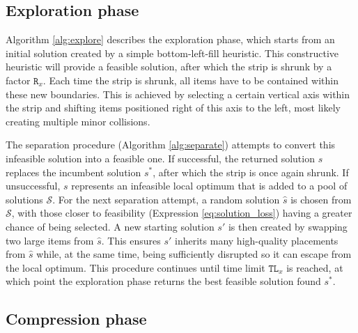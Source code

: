 \documentclass[preprint, 11pt, authoryear]{elsarticle}
\newcommand{\JEROENI}[1]{\todo[inline, color=orange!30, size=\scriptsize]{\textbf{J}: #1}}
\newcommand{\LUKEI}[1]{\todo[inline, color=red!30, size=\scriptsize]{\textbf{L}: #1}}
\begin{document}
 

\subsection{Exploration phase} \label{section:exploration_phase}



Algorithm \ref{alg:explore} describes the exploration phase, which starts from an initial solution created by a simple bottom-left-fill heuristic.
This constructive heuristic will provide a feasible solution, after which the strip is shrunk by a factor $\texttt{R}_{x}$.
Each time the strip is shrunk, all items have to be contained within these new boundaries.
This is achieved by selecting a certain vertical axis within the strip and shifting items positioned right of this axis to the left, most likely creating multiple minor collisions.

The separation procedure (Algorithm \ref{alg:separate}) attempts to convert this infeasible solution into a feasible one.
If successful, the returned solution $s$ replaces the incumbent solution $s^*$, after which the strip is once again shrunk.
If unsuccessful, $s$ represents an infeasible local optimum that is added to a pool of solutions $\mathcal{S}$.
For the next separation attempt, a random solution $\hat{s}$ is chosen from $\mathcal{S}$, with those closer to feasibility (Expression \ref{eq:solution_loss}) having a greater chance of being selected.
A new starting solution $s'$ is then created by swapping two large items from $\hat{s}$.
This ensures $s'$ inherits many high-quality placements from $\hat{s}$ while, at the same time, being sufficiently disrupted so it can escape from the local optimum.
This procedure continues until time limit $\texttt{TL}_x$ is reached, at which point the exploration phase returns the best feasible solution found $s^*$.

\subsection{Compression phase} \label{section:compression_phase}
\end{document}
